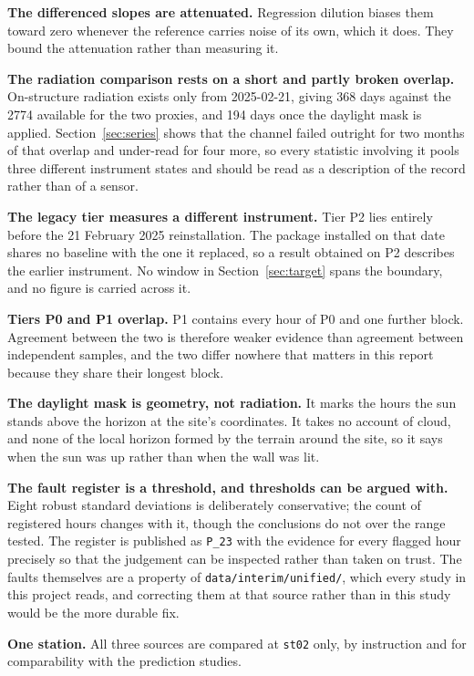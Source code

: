 \documentclass[11pt,a4paper]{article}
\begin{document}
\textbf{The differenced slopes are attenuated.} Regression dilution biases them
toward zero whenever the reference carries noise of its own, which it does. They
bound the attenuation rather than measuring it.

\textbf{The radiation comparison rests on a short and partly broken overlap.}
On-structure radiation exists only from 2025-02-21, giving 368 days against the
2774 available for the two proxies, and 194 days once the daylight mask is
applied. Section~\ref{sec:series} shows that the channel failed outright for two
months of that overlap and under-read for four more, so every statistic
involving it pools three different instrument states and should be read as a
description of the record rather than of a sensor.

\textbf{The legacy tier measures a different instrument.} Tier P2 lies entirely
before the 21 February 2025 reinstallation. The package installed on that date
shares no baseline with the one it replaced, so a result obtained on P2
describes the earlier instrument. No window in Section~\ref{sec:target} spans
the boundary, and no figure is carried across it.

\textbf{Tiers P0 and P1 overlap.} P1 contains every hour of P0 and one further
block. Agreement between the two is therefore weaker evidence than agreement
between independent samples, and the two differ nowhere that matters in this
report because they share their longest block.

\textbf{The daylight mask is geometry, not radiation.} It marks the hours the
sun stands above the horizon at the site's coordinates. It takes no account of
cloud, and none of the local horizon formed by the terrain around the site, so
it says when the sun was up rather than when the wall was lit.

\textbf{The fault register is a threshold, and thresholds can be argued with.}
Eight robust standard deviations is deliberately conservative; the count of
registered hours changes with it, though the conclusions do not over the range
tested. The register is published as \texttt{P\_23} with the evidence for every
flagged hour precisely so that the judgement can be inspected rather than taken
on trust. The faults themselves are a property of
\texttt{data/interim/unified/}, which every study in this project reads, and
correcting them at that source rather than in this study would be the more
durable fix.

\textbf{One station.} All three sources are compared at \texttt{st02} only, by
instruction and for comparability with the prediction studies.
\end{document}
